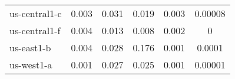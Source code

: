 \begin{table}[]
\begin{tabular}{lccccc}
us-central1-c                                    & 0.003                                   & 0.031                           & 0.019                                & 0.003                                                                                    & 0.00008                                                                           \\
us-central1-f                                    & 0.004                                   & 0.013                           & 0.008                                & 0.002                                                                                    & 0                                                                                 \\
us-east1-b                                       & 0.004                                   & 0.028                           & 0.176                                & 0.001                                                                                    & 0.0001                                                                            \\
us-west1-a                                       & 0.001                                   & 0.027                           & 0.025                                & 0.001                                                                                    & 0.00001                                                                          
\end{tabular}
\end{table}
